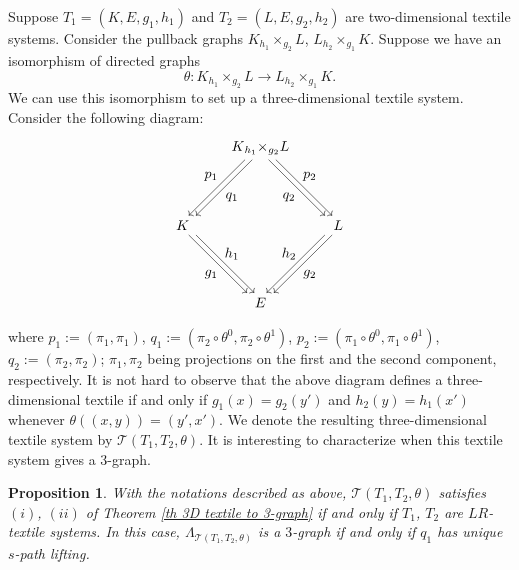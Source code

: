 \documentclass[a4paper,reqno,12pt]{amsart}
\newtheorem{prop}[thm]{Proposition}
\theoremstyle{definition}
\theoremstyle{remark}
\begin{document}
Suppose $T_1=(K,E,g_1,h_1)$ and $T_2=(L,E,g_2,h_2)$ are two-dimensional textile systems. Consider the pullback graphs $K{{}_{h_1}\times_{g_2}}L$, $L{{}_{h_2}\times_{g_1}}K$. Suppose we have an isomorphism of directed graphs \[\theta: K{{}_{h_1}\times_{g_2}}L\longrightarrow L{{}_{h_2}\times_{g_1}}K.\] We can use this isomorphism to set up a three-dimensional textile system. Consider the following diagram:
\[
\begin{tikzpicture}[scale=1.3]
\node[] (B) at (-1.5,0) {$K$};
\node[] (C) at (1.5,0) {$L$};	
\node[] (D) at (0,-1.5) {$E$};
\node[] (A) at (0,1.5) {$K{{}_{h_1}\times_{g_2}}L$}; 

\draw[transform canvas={xshift=0.6ex}, ->] (A) -- (B);
\draw[transform canvas={xshift=-0.6ex}, ->] (A) -- (B);

\draw[transform canvas={xshift=0.6ex}, ->] (A) -- (C);
\draw[transform canvas={xshift=-0.6ex}, ->] (A) -- (C);

\draw[transform canvas={xshift=0.6ex}, ->] (C) -- (D);
\draw[transform canvas={xshift=-0.6ex}, ->] (C) -- (D);

\draw[transform canvas={xshift=0.6ex}, ->] (B) -- (D);
\draw[transform canvas={xshift=-0.6ex}, ->] (B) -- (D);

\node at (-0.55,0.55) {$q_1$};
\node at (-0.95,0.95) {$p_1$};

\node at (0.55,0.55) {$q_2$};
\node at (0.95,0.95) {$p_2$};

\node at (-0.55,-0.55) {$h_1$};
\node at (-0.95,-0.95) {$g_1$};

\node at (0.55,-0.55) {$h_2$};
\node at (0.95,-0.95) {$g_2$};
\end{tikzpicture}
\]
where $p_1:=(\pi_1,\pi_1)$, $q_1:=(\pi_2\circ \theta^0, \pi_2\circ \theta^1)$, $p_2:=(\pi_1\circ \theta^0,\pi_1\circ \theta^1)$, $q_2:=(\pi_2,\pi_2)$; $\pi_1,\pi_2$ being projections on the first and the second component, respectively. It is not hard to observe that the above diagram defines a three-dimensional textile if and only if $g_1(x)=g_2(y')$ and $h_2(y)=h_1(x')$ whenever $\theta((x,y))=(y',x')$. We denote the resulting three-dimensional textile system by $\mathcal{T}(T_1,T_2,\theta)$. It is interesting to characterize when this textile system gives a $3$-graph.
\begin{prop}\label{pro 2-textiles giving a 3-graph}
With the notations described as above, $\mathcal{T}(T_1,T_2,\theta)$ satisfies $(i)$, $(ii)$ of Theorem \ref{th 3D textile to 3-graph} if and only if $T_1$, $T_2$ are $LR$-textile systems. In this case, $\Lambda_{\mathcal{T}(T_1,T_2,\theta)}$ is a $3$-graph if and only if $q_1$ has unique $s$-path lifting.     
\end{prop}
\end{document}
